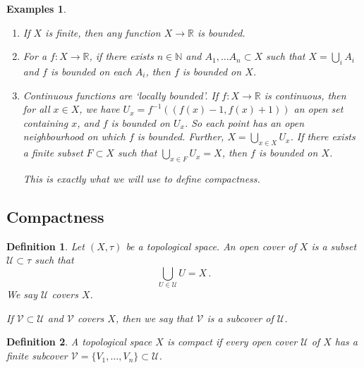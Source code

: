 \documentclass{article}
\theoremstyle{plain}\theoremheaderfont{\normalfont\itshape}\theorembodyfont{\rmfamily}\theoremseparator{.}\newtheorem*{rem}{Remark}\newtheorem*{ex}{Example}\newtheorem*{proof}{Proof}\newtheorem*{altp}{Alternative proof}
\theoremstyle{plain}\theoremheaderfont{\normalfont\bfseries}\theorembodyfont{\rmfamily}\theoremseparator{.}\newtheorem{thm}{Theorem}[section]\newtheorem{lem}[thm]{Lemma}\newtheorem{prop}[thm]{Proposition}\newtheorem*{cor}{Corollary}\newtheorem{defn}[thm]{Definition}\newtheorem{clm}[thm]{Claim}\newtheorem{clminproof}{Claim}
\theoremstyle{break}\theoremheaderfont{\normalfont\itshape}\theorembodyfont{\rmfamily}\theoremseparator{.\medskip}\newtheorem*{proofskip}{Proof}\newtheorem*{exs}{Examples}\newtheorem*{rems}{Remarks}
\theoremstyle{break}\theoremheaderfont{\normalfont\bfseries}\theorembodyfont{\rmfamily}\theoremseparator{.\medskip}\newtheorem{lemskip}[thm]{Lemma}\newtheorem{defnskip}[thm]{Definition}\newtheorem{propskip}[thm]{Proposition}\newtheorem{thmskip}[thm]{Theorem}
\begin{document}
    \begin{exs}
        \begin{enumerate}[label=(\roman*),topsep=0pt]
            \item If \(X\) is finite, then any function \(X\to\mathbb{R}\) is bounded.
            \item For a \(f:X\to\mathbb{R}\), if there exists \(n\in\mathbb{N}\) and \(A_1,\dots A_n\subset X\) such that \(X=\bigcup_{i}A_i\) and \(f\) is bounded on each \(A_i\), then \(f\) is bounded on \(X\).
            \item Continuous functions are `locally bounded'. If \(f:X\to\mathbb{R}\) is continuous, then for all \(x\in X\), we have \(U_x=f^{-1}((f(x)-1,f(x)+1))\) an open set containing \(x\), and \(f\) is bounded on \(U_x\). So each point has an open neighbourhood on which \(f\) is bounded. Further, \(X=\bigcup_{x\in X}U_x\). If there exists a finite subset \(F\subset X\) such that \(\bigcup_{x\in F}U_x=X\), then \(f\) is bounded on \(X\).
            
            This is exactly what we will use to define compactness.
        \end{enumerate}
    \end{exs}

    \subsection{Compactness}
    \begin{defn}
        Let \((X,\tau)\) be a topological space. An \textit{open cover} of \(X\) is a subset \(\mathscr{U}\subset\tau\) such that
        \[\bigcup_{U\in\mathscr{U}}U=X\,.\]
        We say \(\mathscr{U}\) covers \(X\).

        If \(\mathscr{V}\subset\mathscr{U}\) and \(\mathscr{V}\) covers \(X\), then we say that \(\mathscr{V}\) is a \textit{subcover} of \(\mathscr{U}\).
    \end{defn}

    \begin{defn}
        A topological space \(X\) is \textit{compact} if every open cover \(\mathscr{U}\) of \(X\) has a finite subcover \(\mathscr{V}=\{V_1,\dots,V_n\}\subset\mathscr{U}\).
    \end{defn}
\end{document}
